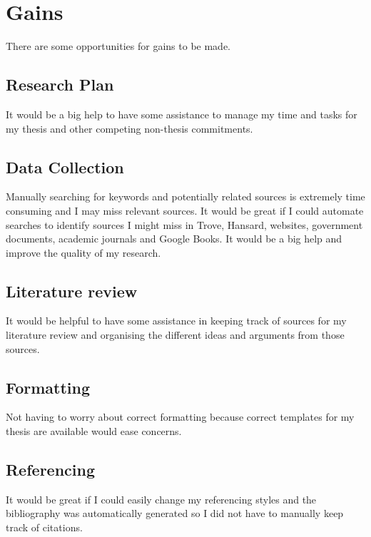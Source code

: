 \documentclass{article}
\begin{document}
\section*{Gains}

There are some opportunities for gains to be made.
\subsection*{Research Plan}

It would be a big help to have some assistance to manage my time and tasks for my thesis and other competing non-thesis commitments.\par

\subsection*{Data Collection}

Manually searching for keywords and potentially related sources is extremely time consuming and I may miss relevant sources.  It would be great if I could automate searches to identify sources I might miss in Trove, Hansard, websites, government documents, academic journals and Google Books. It would be a big help and improve the quality of my research.\par

\subsection*{Literature review}

It would be helpful to have some assistance in keeping track of sources for my literature review and organising the different ideas and arguments from those sources.\par

\subsection*{Formatting}

Not having to worry about correct formatting because correct templates for my thesis are available would ease concerns.\par

\subsection*{Referencing}

It would be great if I could easily change my referencing styles and the bibliography was automatically generated so I did not have to manually keep track of citations.\par
\end{document}
